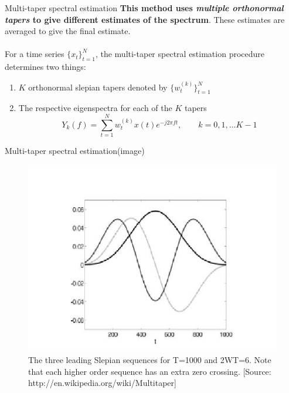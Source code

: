 \documentclass[mathserif]{beamer}
\begin{document}
\begin{frame}{Multi-taper spectral estimation}
\textbf{This method uses \emph{multiple orthonormal tapers} to give different estimates of the spectrum}. These estimates are averaged to give the final estimate. \\~\\


For a time series $\{x_t\}_{t=1}^N$, the multi-taper spectral estimation procedure determines two things:
\begin{enumerate}
    \item $K$ orthonormal slepian tapers denoted by $\{w_t^{(k)}\}_{t=1}^{N}$
    \item The respective eigenspectra for each of the $K$ tapers
\begin{equation*}
   Y_k(f) = \sum_{t=1}^N w_t^{(k)} x(t) e^{-j2\pi{}ft}, \qquad k = 0, 1, ...K-1
\end{equation*}
\end{enumerate}

\end{frame}




\begin{frame}{Multi-taper spectral estimation(image)}
\begin{figure}[p]
\centering
\includegraphics[height=0.65\textheight]{DPSS_figure.jpg}
\caption{The three leading Slepian sequences for T=1000 and 2WT=6. Note that each higher order sequence has an extra zero crossing. [Source: http://en.wikipedia.org/wiki/Multitaper]}
\end{figure}

\end{frame}
\end{document}
